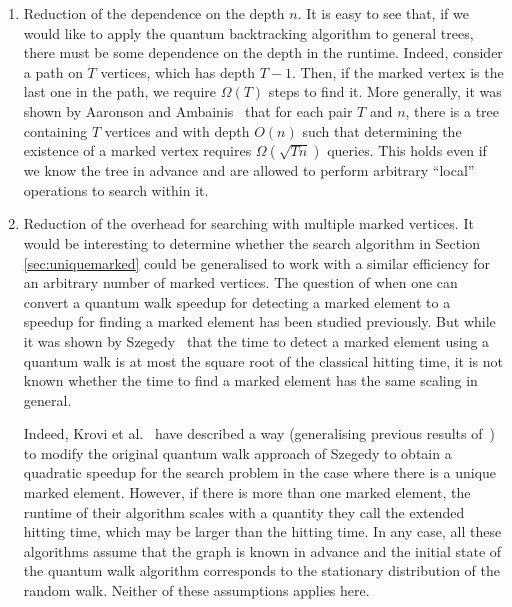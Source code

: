 \documentclass[11pt]{article}
\newcommand{\ket}[1]{| #1 \rangle}
\begin{document}
\begin{enumerate}
\item Reduction of the dependence on the depth $n$. It is easy to see that, if we would like to apply the quantum backtracking algorithm to general trees, there must be some dependence on the depth in the runtime. %
Indeed, consider a path on $T$ vertices, which has depth $T-1$. Then, if the marked vertex is the last one in the path, we require $\Omega(T)$ steps to find it. More generally, it was shown by Aaronson and Ambainis~\cite{aaronson05} that for each pair $T$ and $n$, there is a tree containing $T$ vertices and with depth $O(n)$ such that determining the existence of a marked vertex requires $\Omega(\sqrt{Tn})$ queries. This holds even if we know the tree in advance and are allowed to perform arbitrary ``local'' operations to search within it.

\item Reduction of the overhead for searching with multiple marked vertices. It would be interesting to determine whether the search algorithm in Section \ref{sec:uniquemarked} could be generalised to work with a similar efficiency for an arbitrary number of marked vertices. The question of when one can convert a quantum walk speedup for detecting a marked element to a speedup for finding a marked element has been studied previously. But while it was shown by Szegedy~\cite{szegedy04} that the time to detect a marked element using a quantum walk is at most the square root of the classical hitting time, it is not  known whether the time to find a marked element has the same scaling in general.

Indeed, Krovi et al.~\cite{krovi15} have described a way (generalising previous results of~\cite{tulsi08,magniez12}) to modify the original quantum walk approach of Szegedy to obtain a quadratic speedup for the search problem in the case where there is a unique marked element. However, if there is more than one marked element, the runtime of their algorithm scales with a quantity they call the extended hitting time, which may be larger than the hitting time. In any case, all these algorithms assume that the graph is known in advance and the initial state of the quantum walk algorithm corresponds to the stationary distribution of the random walk. Neither of these assumptions applies here.



\end{enumerate}
\end{document}
